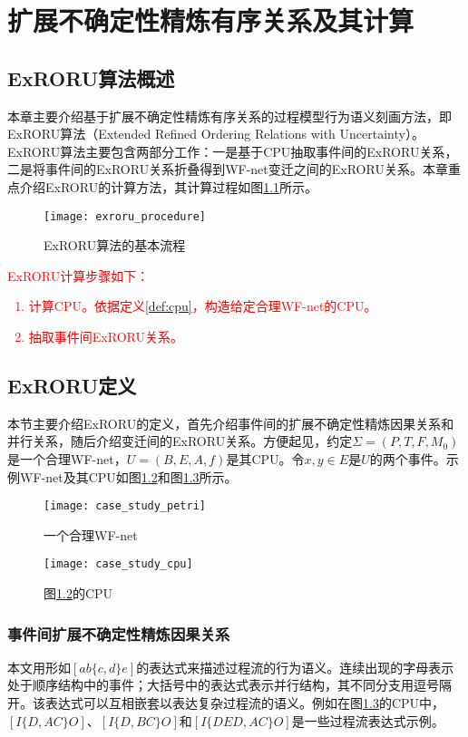 \chapter{扩展不确定性精炼有序关系及其计算}\label{cha:exroru}
\section{ExRORU算法概述}\label{sec:exroru_intro}
本章主要介绍基于扩展不确定性精炼有序关系的过程模型行为语义刻画方法，即ExRORU算法（Extended Refined Ordering Relations with Uncertainty）。ExRORU算法主要包含两部分工作：一是基于CPU抽取事件间的ExRORU关系，二是将事件间的ExRORU关系折叠得到WF-net变迁之间的ExRORU关系。本章重点介绍ExRORU的计算方法，其计算过程如图\ref{fig:exroru_procedure}所示。

\begin{figure}[htbp]
  \centering
  \texttt{[image: exroru\_procedure]}
  \caption{ExRORU算法的基本流程\label{fig:exroru_procedure}}
\end{figure}

\textcolor{red}{
ExRORU计算步骤如下：
\begin{enumerate}[1.]
  \item 计算CPU。依据定义\ref{def:cpu}，构造给定合理WF-net的CPU。
  \item 抽取事件间ExRORU关系。
\end{enumerate}
}

\section{ExRORU定义}\label{sec:exroru_definition}
本节主要介绍ExRORU的定义，首先介绍事件间的扩展不确定性精炼因果关系和并行关系，随后介绍变迁间的ExRORU关系。方便起见，约定$\Sigma=(P,T,F,M_{0})$是一个合理WF-net，$U=(B,E,A,f)$是其CPU。令$x,y\in E$是$U$的两个事件。示例WF-net及其CPU如图\ref{fig:case_study_petri}和图\ref{fig:case_study_cpu}所示。

\begin{figure}[htbp]
  \centering
  \texttt{[image: case\_study\_petri]}
  \caption{一个合理WF-net\label{fig:case_study_petri}}
\end{figure}

\begin{figure}[htbp]
  \centering
  \texttt{[image: case\_study\_cpu]}
  \caption{图\ref{fig:case_study_petri}的CPU\label{fig:case_study_cpu}}
\end{figure}

\subsection{事件间扩展不确定性精炼因果关系}\label{subsec:exroru_causal}
本文用形如$[ab\{c,d\}e]$的表达式来描述过程流的行为语义。连续出现的字母表示处于顺序结构中的事件；大括号中的表达式表示并行结构，其不同分支用逗号隔开。该表达式可以互相嵌套以表达复杂过程流的语义。例如在图\ref{fig:case_study_cpu}的CPU中，$[I\{D,AC\}O]$、$[I\{D,BC\}O]$和$[I\{DED,AC\}O]$是一些过程流表达式示例。

